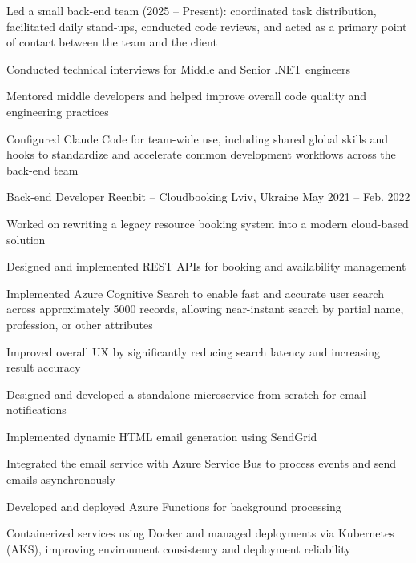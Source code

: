 \begin{cventries}
{\begin{cvitems}
        \item {Led a small back-end team (2025 – Present): coordinated task distribution, facilitated daily stand-ups, conducted code reviews, and acted as a primary point of contact between the team and the client}
        \item {Conducted technical interviews for Middle and Senior .NET engineers}
        \item {Mentored middle developers and helped improve overall code quality and engineering practices}
        \item {Configured Claude Code for team-wide use, including shared global skills and hooks to standardize and accelerate common development workflows across the back-end team}
      \end{cvitems}
    }

  \cventry
    {Back-end Developer} %
    {Reenbit – Cloudbooking} %
    {Lviv, Ukraine} %
    {May 2021 – Feb. 2022} %
    {
      \begin{cvitems} %
        \item {Worked on rewriting a legacy resource booking system into a modern cloud-based solution}
        \item {Designed and implemented REST APIs for booking and availability management}
        \item {Implemented Azure Cognitive Search to enable fast and accurate user search across approximately 5000 records, allowing near-instant search by partial name, profession, or other attributes}
        \item {Improved overall UX by significantly reducing search latency and increasing result accuracy}
        \item {Designed and developed a standalone microservice from scratch for email notifications}
        \item {Implemented dynamic HTML email generation using SendGrid}
        \item {Integrated the email service with Azure Service Bus to process events and send emails asynchronously}
        \item {Developed and deployed Azure Functions for background processing}
        \item {Containerized services using Docker and managed deployments via Kubernetes (AKS), improving environment consistency and deployment reliability}
      \end{cvitems}
    }


\end{cventries}
